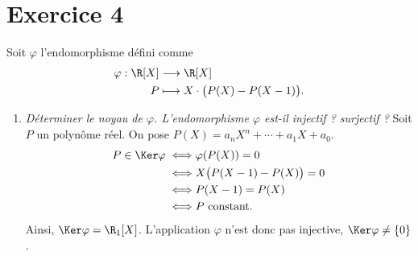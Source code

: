 \section{Exercice 4}

Soit $\varphi$\/ l'endomorphisme défini comme \begin{align*}
	\varphi: \R[X] &\longrightarrow \R[X] \\
	P &\longmapsto X\cdot \big(P(X) - P(X-1)\big).
\end{align*}
\begin{enumerate}
	\item {\slshape Déterminer le noyau de $\varphi$. L'endomorphisme $\varphi$\/ est-il injectif ? surjectif ?}
		Soit $P$\/ un polynôme réel. On pose $P(X) = a_n X^n + \cdots + a_1 X + a_0$.
		\begin{align*}
			P \in \Ker \varphi \iff& \varphi(P(X)) = 0\\
			\iff& X\big(P(X-1) - P(X)\big) = 0\\
			\iff& P(X - 1) = P(X)\\
			\iff& P \text{ constant}.
		\end{align*}
		Ainsi, $\Ker \varphi = \R_1[X]$.
		L'application $\varphi$\/ n'est donc pas injective, $\Ker \varphi \neq \{0\}$.
		

\end{enumerate}
